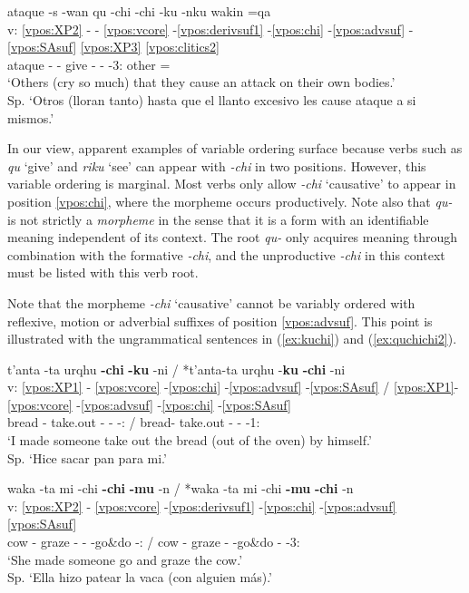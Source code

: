 \documentclass[output=paper]{langscibook}
\begin{document}
\ea \label{ex:quchichi}
	\glll {} ataque -s -wan qu -chi -chi -ku -nku wakin =qa \\
        v: \ref{vpos:XP2} - - \ref{vpos:vcore} -\ref{vpos:derivsuf1} -\ref{vpos:chi} -\ref{vpos:advsuf} -\ref{vpos:SAsuf} \ref{vpos:XP3} \ref{vpos:clitics2} \\
		{} ataque -\Pl{} -\Com{} give -\Caus{} -\Refl{} -3:\Pl{} other =\Top{}	 \\
	\glt `Others (cry so much) that they cause an attack on their own bodies.' \\ Sp. `Otros (lloran tanto) hasta que el llanto excesivo les cause ataque a si mismos.' 
\z


In our view, apparent examples of variable ordering surface because verbs such as \textit{qu} `give' and \textit{riku} `see' can appear with \textit{-chi} in two positions. However, this variable ordering is marginal. Most verbs only allow \textit{-chi} `causative' to appear in position \ref{vpos:chi}, where the morpheme occurs productively. Note also that \textit{qu-} is not strictly a \textit{morpheme} in the sense that it is a form with an identifiable meaning independent of its context. The root \textit{qu-} only acquires meaning through combination with the formative \textit{-chi}, and the unproductive \textit{-chi} in this context must be listed with this verb root.

Note that the morpheme \textit{-chi} `causative' cannot be variably ordered with reflexive, motion or adverbial suffixes of position \ref{vpos:advsuf}. This point is illustrated with the ungrammatical sentences in (\ref{ex:kuchi}) and (\ref{ex:quchichi2}).

\ea \label{ex:kuchi}
	\glll {}  t'anta -ta urqhu \textbf{-chi} \textbf{-ku} -ni / *t'anta-ta urqhu -\textbf{ku} \textbf{-chi} -ni \\
        v: \ref{vpos:XP1} - \ref{vpos:vcore} -\ref{vpos:chi} -\ref{vpos:advsuf} -\ref{vpos:SAsuf} / \ref{vpos:XP1}- \ref{vpos:vcore} -\ref{vpos:advsuf} -\ref{vpos:chi} -\ref{vpos:SAsuf}  \\
		{} bread -\Acc{} take.out -\Caus{} -\Refl{} -\First{}:\Sg{} / bread-\Acc{} take.out -\Refl{} -\Caus{} -1:\Sg{} 	\\
	\glt `I made someone take out the bread (out of the oven) by himself.' \\ Sp. `Hice sacar pan para mi.' \hfill 
\z

\ea \label{ex:quchichi2}
	\glll {} waka -ta mi -chi \textbf{-chi} \textbf{-mu} -n  / *waka -ta mi -chi \textbf{-mu} \textbf{-chi} -n \\
        v: \ref{vpos:XP2} - \ref{vpos:vcore} -\ref{vpos:derivsuf1} -\ref{vpos:chi} -\ref{vpos:advsuf} \ref{vpos:SAsuf} \\
		{} cow -\Acc{} graze -\Caus{} -\Caus{} -go\&do -\Third{}:\Sg{} / cow -\Acc{} graze -\Caus{} -go\&do -\Caus{} -3:\Sg{}	\\
	\glt `She made someone go and graze the cow.' \\ Sp. `Ella hizo patear la vaca (con alguien más).' \hfill 
\z
\end{document}
